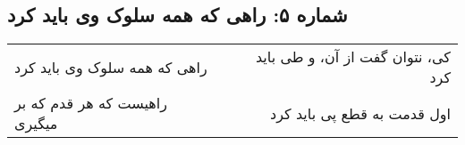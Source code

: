 \begin{center}
\section*{شماره ۵: راهی که همه سلوک وی باید کرد}
\label{sec:005}
\begin{longtable}{l p{0.5cm} r}
راهی که همه سلوک وی باید کرد
&&
کی، نتوان گفت از آن، و طی باید کرد
\\
راهیست که هر قدم که بر میگیری
&&
اول قدمت به قطع پی باید کرد
\\
\end{longtable}
\end{center}
